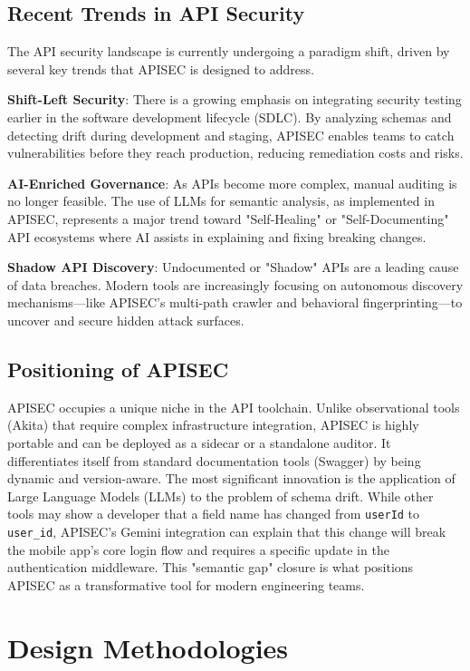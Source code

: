 \documentclass{fisatprojectfinal}
\begin{document}
\section{Recent Trends in API Security}
The API security landscape is currently undergoing a paradigm shift, driven by several key trends that APISEC is designed to address.

\textbf{Shift-Left Security}: There is a growing emphasis on integrating security testing earlier in the software development lifecycle (SDLC). By analyzing schemas and detecting drift during development and staging, APISEC enables teams to catch vulnerabilities before they reach production, reducing remediation costs and risks.

\textbf{AI-Enriched Governance}: As APIs become more complex, manual auditing is no longer feasible. The use of LLMs for semantic analysis, as implemented in APISEC, represents a major trend toward "Self-Healing" or "Self-Documenting" API ecosystems where AI assists in explaining and fixing breaking changes.

\textbf{Shadow API Discovery}: Undocumented or "Shadow" APIs are a leading cause of data breaches. Modern tools are increasingly focusing on autonomous discovery mechanisms—like APISEC's multi-path crawler and behavioral fingerprinting—to uncover and secure hidden attack surfaces.

\section{Positioning of APISEC}
APISEC occupies a unique niche in the API toolchain. Unlike observational tools (Akita) that require complex infrastructure integration, APISEC is highly portable and can be deployed as a sidecar or a standalone auditor. It differentiates itself from standard documentation tools (Swagger) by being dynamic and version-aware. The most significant innovation is the application of Large Language Models (LLMs) to the problem of schema drift. While other tools may show a developer that a field name has changed from \texttt{userId} to \texttt{user\_id}, APISEC's Gemini integration can explain that this change will break the mobile app's core login flow and requires a specific update in the authentication middleware. This "semantic gap" closure is what positions APISEC as a transformative tool for modern engineering teams.


\chapter{Design Methodologies}
\end{document}
